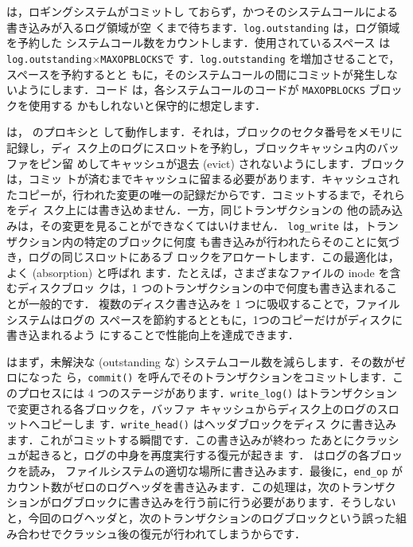 は，ロギングシステムがコミットし
ておらず，かつそのシステムコールによる書き込みが入るログ領域が空
くまで待ちます．\texttt{log.outstanding} は，ログ領域を予約した
システムコール数をカウントします．使用されているスペース
は\texttt{log.outstanding}$\times$\texttt{MAXOPBLOCKS}で
す．\texttt{log.outstanding} を増加させることで，スペースを予約するとと
もに，そのシステムコールの間にコミットが発生しないようにします．コード
は，各システムコールのコードが \texttt{MAXOPBLOCKS} ブロックを使用する
かもしれないと保守的に想定します．

は， のプロキシと
して動作します．それは，ブロックのセクタ番号をメモリに記録し，ディ
スク上のログにスロットを予約し，ブロックキャッシュ内のバッファをピン留
めしてキャッシュが退去 (evict) されないようにします．ブロックは，コミッ
トが済むまでキャッシュに留まる必要があります．キャッシュされ
たコピーが，行われた変更の唯一の記録だからです．コミットするまで，それらをディ
スク上には書き込めません．一方，同じトランザクションの
他の読み込みは，その変更を見ることができなくてはいけません．
\texttt{log\_write} は，トランザクション内の特定のブロックに何度
も書き込みが行われたらそのことに気づき，ログの同じスロットにあるブ
ロックをアロケートします．この最適化は，よく (absorption) と呼ばれ
ます．たとえば，さまざまなファイルの inode を含むディスクブロッ
クは，1 つのトランザクションの中で何度も書き込まれることが一般的です．
複数のディスク書き込みを 1 つに吸収することで，ファイルシステムはログの
スペースを節約するとともに，1つのコピーだけがディスクに書き込まれるよう
にすることで性能向上を達成できます．

はまず，未解決な (outstanding
な) システムコール数を減らします．その数がゼロになった
ら，\texttt{commit()} を呼んでそのトランザクションをコミットします．こ
のプロセスには 4 つのステージがあります．\texttt{write\_log()}
はトランザクションで変更される各ブロックを，バッファ
キャッシュからディスク上のログのスロットへコピーしま
す．\texttt{write\_head()}  はヘッダブロックをディス
クに書き込みます．これがコミットする瞬間です．この書き込みが終わっ
たあとにクラッシュが起きると，ログの中身を再度実行する復元が起きま
す． 
はログの各ブロックを読み，
ファイルシステムの適切な場所に書き込みます．最後に，\texttt{end\_op} が
カウント数がゼロのログヘッダを書き込みます．この処理は，次のトランザク
ションがログブロックに書き込みを行う前に行う必要があります．そうしない
と，今回のログヘッダと，次のトランザクションのログブロックという誤った組
み合わせでクラッシュ後の復元が行われてしまうからです．

